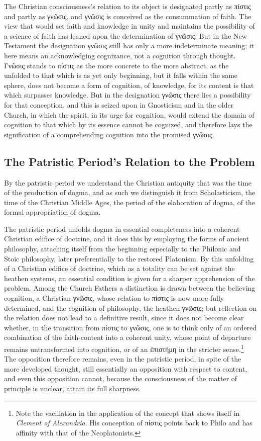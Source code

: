 \documentclass[12pt,a4paper]{book}
\begin{document}
The Christian consciousness's relation to its object is designated partly as
πίστις and partly as γνῶσις, and γνῶσις is conceived as the consummation of
faith. The view that would set faith and knowledge in unity and maintains
the possibility of a science of faith has leaned upon the determination of
γνῶσις. But in the New Testament the designation γνῶσις still has only a more
indeterminate meaning; it here means an acknowledging cognizance, not a
cognition through thought. Γνῶσις stands to πίστις as the more concrete to
the more abstract, as the unfolded to that which is as yet only beginning,
but it falls within the same sphere, does not become a form of cognition, of
knowledge, for its content is that which surpasses knowledge. But in the
designation γνῶσις there lies a possibility for that conception, and this is
seized upon in Gnosticism and in the older Church, in which the spirit, in
its urge for cognition, would extend the domain of cognition to that which
by its essence cannot be cognized, and therefore lays the signification of a
comprehending cognition into the promised γνῶσις.

\subsection{The Patristic Period's Relation to the Problem}
\label{ssec:patristic}

\noindent By the patristic period we understand the Christian antiquity that
was the time of the production of dogma, and as such we distinguish it from
Scholasticism, the time of the Christian Middle Ages, the period of the
elaboration of dogma, of the formal appropriation of dogma.

The patristic period unfolds dogma in essential completeness into a coherent
Christian edifice of doctrine, and it does this by employing the forms of
ancient philosophy, attaching itself from the beginning especially to the
Philonic and Stoic philosophy, later preferentially to the restored
Platonism. By this unfolding of a Christian edifice of doctrine, which as a
totality can be set against the heathen systems, an essential condition is
given for a sharper apprehension of the problem. Among the Church Fathers a
distinction is drawn between the believing cognition, a Christian γνῶσις,
whose relation to πίστις is now more fully determined, and the cognition of
philosophy, the heathen γνῶσις; but reflection on the relation does not lead
to a definitive result, since it does not become clear whether, in the transition
from πίστις to γνῶσις, one is to think only of an ordered combination of the
faith-content into a coherent unity, whose point of departure remains
untransformed into cognition, or of an ἐπιστήμη in the stricter
sense.\footnote{Note the vacillation in the application of the concept that
shows itself in \emph{Clement of Alexandria}. His conception of πίστις points back
to Philo and has affinity with that of the Neoplatonists.} The opposition
therefore remains, even in the patristic period, in spite of the more
developed thought, still essentially an opposition with respect to content,
and even this opposition cannot, because the consciousness of the matter of
principle is unclear, attain its full sharpness.
\end{document}
